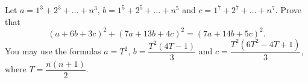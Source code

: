 Let $a=1^3+2^3+\dots+n^3$, $b=1^5+2^5+\dots+n^5$ and $c=1^7+2^7+\dots+n^7$. Prove that
\[
(a+6b+3c)^2+(7a+13b+4c)^2=(7a+14b+5c)^2 .
\]
You may use the formulas $a=T^2$, $b=\dfrac{T^2(4T-1)}{3}$ and $c=\dfrac{T^2\left(6T^2-4T+1\right)}{3}$, where $T=\dfrac{n(n+1)}{2}$.
